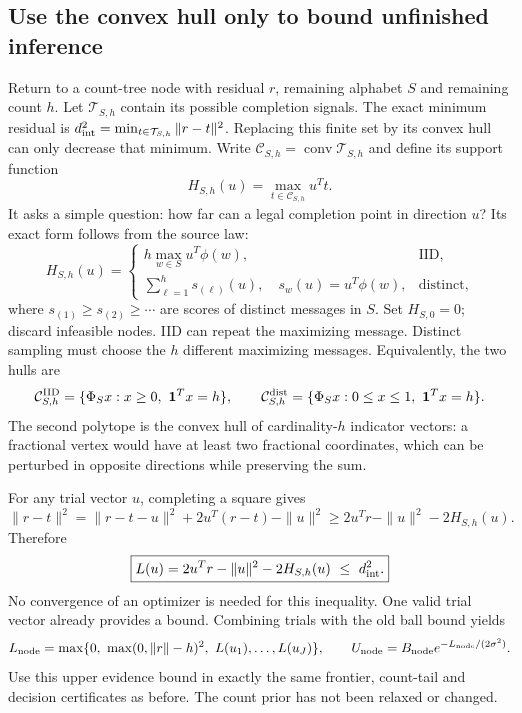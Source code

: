 \documentclass[10pt,a4paper]{article}
\begin{document}
\subsection{Use the convex hull only to bound unfinished inference}
Return to a count-tree node with residual $r$, remaining alphabet $S$ and remaining count $h$.
Let $\mathcal T_{S,h}$ contain its possible completion signals. The exact minimum residual is
$d_{\rm int}^2=\min_{t\in\mathcal T_{S,h}}\|r-t\|^2$.
Replacing this finite set by its convex hull can only decrease that minimum. Write
$\mathcal C_{S,h}=\operatorname{conv}\mathcal T_{S,h}$ and define its support function
\[
 H_{S,h}(u)=\max_{t\in\mathcal C_{S,h}}u^Tt.
\]
It asks a simple question: how far can a legal completion point in direction $u$?
Its exact form follows from the source law:
\begin{equation}
 H_{S,h}(u)=
 \begin{cases}
 h\max_{w\in S}u^T\phi(w),&\text{IID},\\
 \displaystyle\sum_{\ell=1}^h s_{(\ell)}(u),
       \quad s_w(u)=u^T\phi(w),&\text{distinct},
 \end{cases}
 \label{eq:completion-support}
\end{equation}
where $s_{(1)}\geq s_{(2)}\geq\cdots$ are scores of distinct messages in $S$.
Set $H_{S,0}=0$; discard infeasible nodes. IID can repeat the maximizing message. Distinct sampling must choose
the $h$ different maximizing messages. Equivalently, the two hulls are
\[
 \mathcal C_{S,h}^{\rm IID}=\{\Phi_Sx:x\geq0,\ \one^Tx=h\},\qquad
 \mathcal C_{S,h}^{\rm dist}=\{\Phi_Sx:0\leq x\leq1,\ \one^Tx=h\}.
\]
The second polytope is the convex hull of cardinality-$h$ indicator vectors: a fractional vertex would have
at least two fractional coordinates, which can be perturbed in opposite directions while preserving the sum.

For any trial vector $u$, completing a square gives
\[
 \|r-t\|^2
 =\|r-t-u\|^2+2u^T(r-t)-\|u\|^2
 \geq 2u^Tr-\|u\|^2-2H_{S,h}(u).
\]
Therefore
\begin{equation}
 \boxed{L(u)=2u^Tr-\|u\|^2-2H_{S,h}(u)\ \leq\ d_{\rm int}^2.}
 \label{eq:completion-dual-bound}
\end{equation}
No convergence of an optimizer is needed for this inequality. One valid trial vector already provides a bound.
Combining trials with the old ball bound yields
\[
 L_{\rm node}=\max\{0,\ \max(0,\|r\|-h)^2,\ L(u_1),\ldots,L(u_J)\},\qquad
 U_{\rm node}=B_{\rm node}e^{-L_{\rm node}/(2\sigma^2)}.
\]
Use this upper evidence bound in exactly the same frontier, count-tail and decision certificates as before.
The count prior has not been relaxed or changed.
\end{document}
